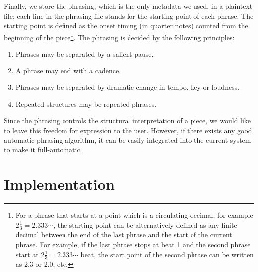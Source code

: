 Finally, we store the phrasing, which is the only metadata we used, in a plaintext file; each line in the phrasing file stands for the starting point of each phrase. The starting point is defined as the onset timing (in quarter notes) counted from the beginning of the piece\footnote{For a phrase that starts at a point which is a circulating decimal, for example $2\frac{1}{3}=2.333\cdots$, the starting point can be alternatively defined as any finite decimal between the end of the last phrase and the start of the current phrase. For example, if the last phrase stops at beat 1 and the second phrase start at $2\frac{1}{3}=2.333\cdots$ beat, the start point of the second phrase can be written as 2.3 or 2.0, etc.}. The phrasing is decided by the following principles: 
\begin{enumerate}
   \item Phrases may be separated by a salient pause.
   \item A phrase may end with a cadence.
   \item Phrases may be separated by dramatic change in tempo, key or loudness.
   \item Repeated structures may be repeated phrases.
\end{enumerate}

Since the phrasing controls the structural interpretation of a piece, we would like to leave this freedom for expression to the user. However, if there exists any good automatic phrasing algorithm, it can be easily integrated into the current system to make it full-automatic.

 
\section{Implementation}

